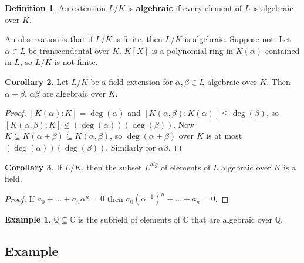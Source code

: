 \documentclass{article}
\newcommand{\Q}{\mathbb{Q}}
\newcommand{\C}{\mathbb{C}}
\newcommand{\rb}[1]{\left( #1 \right)}
\renewcommand{\sb}[1]{\left[ #1 \right]}
\theoremstyle{definition}\newtheorem{definition}{Definition}[subsection]
\theoremstyle{definition}\newtheorem{remark}[definition]{Remark}
\theoremstyle{definition}\newtheorem*{example}{Example}
\theoremstyle{definition}\newtheorem*{note}{Note}
\newtheorem{corollary}[definition]{Corollary}
\begin{document}
\begin{definition}
An extension $ L / K $ is \textbf{algebraic} if every element of $ L $ is algebraic over $ K $.
\end{definition}

An observation is that if $ L / K $ is finite, then $ L / K $ is algebraic. Suppose not. Let $ \alpha \in L $ be transcendental over $ K $. $ K\sb{X} $ is a polynomial ring in $ K\rb{\alpha} $ contained in $ L $, so $ L / K $ is not finite.

\begin{corollary}
Let $ L / K $ be a field extension for $ \alpha, \beta \in L $ algebraic over $ K $. Then $ \alpha + \beta $, $ \alpha\beta $ are algebraic over $ K $.
\end{corollary}

\begin{proof}
$ \sb{K\rb{\alpha} : K} = \deg\rb{\alpha} $ and $ \sb{K\rb{\alpha, \beta} : K\rb{\alpha}} \le \deg\rb{\beta} $, so $ \sb{K\rb{\alpha, \beta} : K} \le \rb{\deg\rb{\alpha}}\rb{\deg\rb{\beta}} $. Now $ K \subseteq K\rb{\alpha + \beta} \subseteq K\rb{\alpha, \beta} $, so $ \deg\rb{\alpha + \beta} $ over $ K $ is at most $ \rb{\deg\rb{\alpha}}\rb{\deg\rb{\beta}} $. Similarly for $ \alpha\beta $.
\end{proof}

\begin{corollary}
If $ L / K $, then the subset $ L^{alg} $ of elements of $ L $ algebraic over $ K $ is a field.
\end{corollary}

\begin{proof}
If $ a_0 + \dots + a_n\alpha^n = 0 $ then $ a_0\rb{\alpha^{-1}}^n + \dots + a_n = 0 $.
\end{proof}

\begin{example}
$ \overline{\Q} \subseteq \C $ is the subfield of elements of $ \C $ that are algebraic over $ \Q $.
\end{example}

\subsection{Example}
\end{document}
